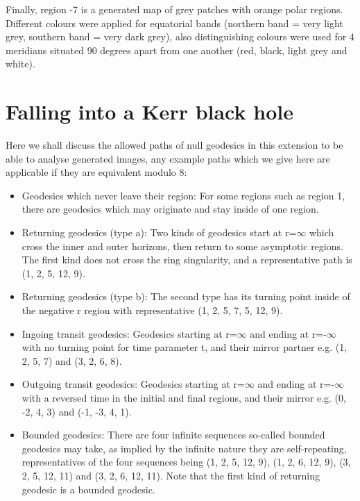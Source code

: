 \documentclass[oneside,openright,frontopenright, singlespacing]{dmathesis}
\begin{document}
\vspace{1em}
	Finally, region -7 is a generated map of grey patches with orange polar regions. Different colours were applied for equatorial bands (northern band = very light grey, southern band = very dark grey), also distinguishing colours were used for 4 meridians situated 90 degrees apart from one another (red, black, light grey and white).

\section{Falling into a Kerr black hole}\label{sec:Section6.2}

\vspace{1em}
	Here we shall discuss the allowed paths of null geodesics in this extension to be able to analyse generated images, any example paths which we give here are applicable if they are equivalent modulo 8:

\vspace{1em}
\begin{itemize}
  \item Geodesics which never leave their region: For some regions such as region 1, there are geodesics which may originate and stay inside of one region.
  \item Returning geodesics (type a): Two kinds of geodesics start at r=$\infty$ which cross the inner and outer horizons, then return to some asymptotic regions. The first kind does not cross the ring singularity, and a representative path is (1, 2, 5, 12, 9).
  \item Returning geodesics (type b): The second type has its turning point inside of the negative r region with representative (1, 2, 5, 7, 5, 12, 9).
  \item Ingoing transit geodesics: Geodesics starting at r=$\infty$ and ending at r=-$\infty$ with no turning point for time parameter t, and their mirror partner e.g. (1, 2, 5, 7) and (3, 2, 6, 8).
  \item Outgoing transit geodesics: Geodesics starting at r=$\infty$ and ending at r=-$\infty$ with a reversed time in the initial and final regions, and their mirror e.g. (0, -2, 4, 3) and (-1, -3, 4, 1).
  \item Bounded geodesics: There are four infinite sequences so-called bounded geodesics may take, as implied by the infinite nature they are self-repeating, representatives of the four sequences being (1, 2, 5, 12, 9), (1, 2, 6, 12, 9), (3, 2, 5, 12, 11) and (3, 2, 6, 12, 11). Note that the first kind of returning geodesic is a bounded geodesic.
\end{itemize}
\end{document}
